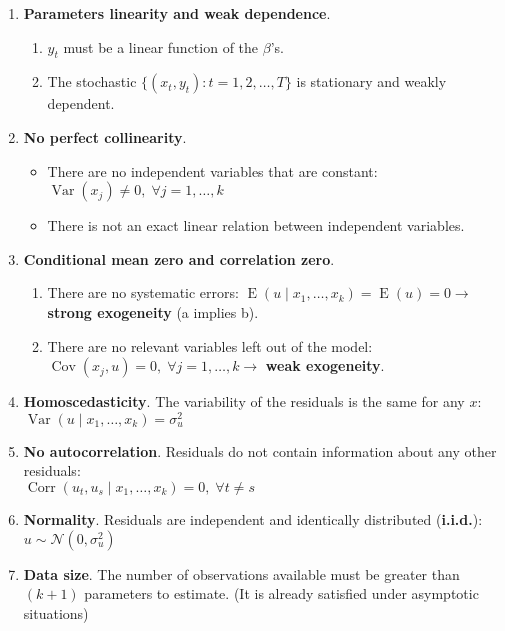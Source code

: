 \documentclass[10pt, a4paper, landscape]{article}
\DeclareMathOperator{\E}{E}
\DeclareMathOperator{\Var}{Var}
\DeclareMathOperator{\Cov}{Cov}
\DeclareMathOperator{\Corr}{Corr}
\begin{document}
\begin{multicols}{3}
\begin{enumerate}[leftmargin=*, label=t\arabic{*}.]
	\item \textbf{Parameters linearity and weak dependence}.
	\begin{enumerate}[leftmargin=*, label=\alph{*}.]
		\item \( y_{t} \) must be a linear function of the \( \beta \)'s.
		\item The stochastic \( \lbrace (x_{t}, y_{t}) : t = 1, 2, \ldots, T \rbrace \) is stationary and weakly dependent.
	\end{enumerate}
	\item \textbf{No perfect collinearity}.
	\begin{itemize}[leftmargin=*]
		\item There are no independent variables that are constant: \( \Var(x_{j}) \neq 0, \; \forall j = 1, \ldots, k \)
		\item There is not an exact linear relation between independent variables.
	\end{itemize}
	\item \textbf{Conditional mean zero and correlation zero}.
	\begin{enumerate}[leftmargin=*, label=\alph{*}.]
		\item There are no systematic errors: \( \E(u \mid x_{1}, \ldots, x_{k}) = \E(u) = 0 \rightarrow \) \textbf{strong exogeneity} (a implies b).
		\item There are no relevant variables left out of the model: \( \Cov(x_{j} , u) = 0, \; \forall j = 1, \ldots, k \rightarrow \) \textbf{weak exogeneity}.
	\end{enumerate}
	\item \textbf{Homoscedasticity}. The variability of the residuals is the same for any \( x \): \( \Var(u \mid x_{1}, \ldots, x_{k}) = \sigma_{u}^{2} \)
	\item \textbf{No autocorrelation}. Residuals do not contain information about any other residuals: \\
	\( \Corr(u_{t}, u_{s} \mid x_{1}, \ldots, x_{k}) = 0, \; \forall t \neq s \)
	\item \textbf{Normality}. Residuals are independent and identically distributed (\textbf{i.i.d.}): \( u \sim \mathcal{N} (0, \sigma_{u}^{2}) \)
	\item \textbf{Data size}. The number of observations available must be greater than \( (k + 1) \) parameters to estimate. (It is already satisfied under asymptotic situations)
\end{enumerate}


\end{multicols}
\end{document}

